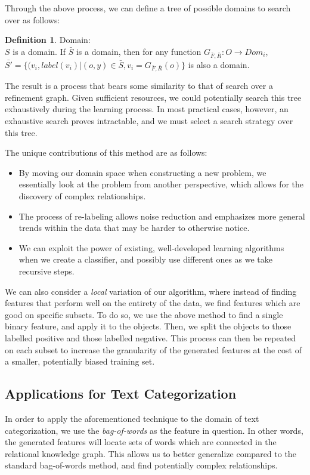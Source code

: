 \documentclass{article}
\theoremstyle{definition}
\newtheorem{defn}{Definition}[section]
\begin{document}
Through the above process, we can define a tree of possible domains to search over as follows:
\begin{defn} Domain:\\%
	$S$ is a domain.
	If $\bar{S}$ is a domain, then for any function $G_{\bar{F},\bar{R}}: O\rightarrow Dom_i$, $\bar{S'}=\{(v_i,label(v_i)|(o,y)\in \bar{S}, v_i=G_{\bar{F},\bar{R}}(o)\}$ is also a domain.
\end{defn}
The result is a process that bears some similarity to that of search over a refinement graph.
Given sufficient resources, we could potentially search this tree exhaustively during the learning process. In most practical cases, however, an exhaustive search proves intractable, and we must select a search strategy over this tree.

The unique contributions of this method are as follows:
\begin{itemize}
	\item By moving our domain space when constructing a new problem, we essentially look at the problem from another perspective, which allows for the discovery of complex relationships.
	\item The process of re-labeling allows noise reduction and emphasizes more general trends within the data that may be harder to otherwise notice.
	\item We can exploit the power of existing, well-developed learning algorithms when we create a classifier, and possibly use different ones as we take recursive steps.
\end{itemize}

We can also consider a \emph{local} variation of our algorithm, where instead of finding features that perform well on the entirety of the data, we find features which are good on specific subsets. To do so, we use the above method to find a single binary feature, and apply it to the objects. Then, we split the objects to those labelled positive and those labelled negative. This process can then be repeated on each subset to increase the granularity of the generated features at the cost of a smaller, potentially biased training set.

\subsection{Applications for Text Categorization}
In order to apply the aforementioned technique to the domain of text categorization, we use the \emph{bag-of-words} as the feature in question. In other words, the generated features will locate sets of words which are connected in the relational knowledge graph. This allows us to better generalize compared to the standard bag-of-words method, and find potentially complex relationships.
\end{document}

